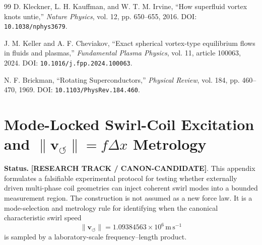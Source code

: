 \begin{thebibliography}{99}
            D. Kleckner, L. H. Kauffman, and W. T. M. Irvine,
            ``How superfluid vortex knots untie,''
            \textit{Nature Physics},
            vol. 12, pp. 650--655, 2016.
            DOI: \texttt{10.1038/nphys3679}.
            
            J. M. Keller and A. F. Cheviakov,
            ``Exact spherical vortex-type equilibrium flows in fluids and plasmas,''
            \textit{Fundamental Plasma Physics},
            vol. 11, article 100063, 2024.
            DOI: \texttt{10.1016/j.fpp.2024.100063}.
            
            N. F. Brickman,
            ``Rotating Superconductors,''
            \textit{Physical Review},
            vol. 184, pp. 460--470, 1969.
            DOI: \texttt{10.1103/PhysRev.184.460}.
        
        \end{thebibliography}
        
        
        

\providecommand{\swirlarrow}{\mathchoice{\mkern-2mu\scriptstyle\boldsymbol{\circlearrowleft}}{\mkern-2mu\scriptstyle\boldsymbol{\circlearrowleft}}{\mkern-2mu\scriptscriptstyle\boldsymbol{\circlearrowleft}}{\mkern-2mu\scriptscriptstyle\boldsymbol{\circlearrowleft}}}
\providecommand{\vswirl}{\mathbf{v}_{\!\swirlarrow}}
\providecommand{\rhoF}{{\rho_{\!f}}}
\providecommand{\rhoE}{\rho_{\!E}}
\providecommand{\rhoM}{\rho_{\!m}}
\providecommand{\rc}{{r_c}}
\providecommand{\vnorm}{\lVert \mathbf{v}_{\!\boldsymbol{\circlearrowleft}} \rVert}

\section{Mode-Locked Swirl-Coil Excitation and \texorpdfstring{$\vnorm=f\Delta x$}{v=f dx} Metrology}
\label{sec:appendix_mode_locked_swirl_coil}

\textbf{Status.} \textbf{[RESEARCH TRACK / CANON-CANDIDATE]}.
This appendix formulates a falsifiable experimental protocol for testing whether externally driven multi-phase coil geometries can inject coherent swirl modes into a bounded measurement region. The construction is not assumed as a new force law. It is a mode-selection and metrology rule for identifying when the canonical characteristic swirl speed
\begin{equation}
\vnorm = 1.09384563\times 10^{6}\,\mathrm{m\,s^{-1}}
\end{equation}
is sampled by a laboratory-scale frequency--length product.

